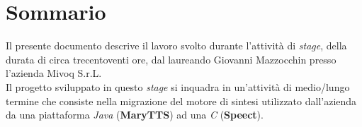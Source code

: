 
\cleardoublepage
{}
{}
\begingroup
\let\clearpage\relax
\let\cleardoublepage\relax
\let\cleardoublepage\relax

\chapter*{Sommario}

Il presente documento descrive il lavoro svolto durante l'attività di \textit{stage}, della durata di circa trecentoventi ore, dal laureando Giovanni Mazzocchin presso l'azienda Mivoq S.r.L. \\ Il progetto sviluppato in questo \textit{stage} si inquadra in un’attività di medio/lungo
termine che consiste nella migrazione del motore di sintesi utilizzato dall’azienda 
da una piattaforma \textit{Java} (\textbf{MaryTTS}) ad una \textit{C} (\textbf{Speect}).

%
%

\endgroup			

\vfill

